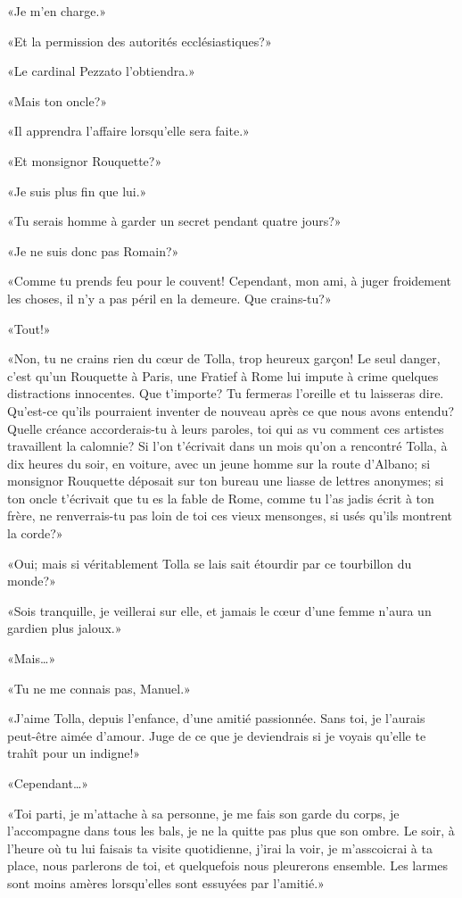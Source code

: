 «Je m'en charge.»

«Et la permission des autorités ecclésiastiques?»

«Le cardinal Pezzato l'obtiendra.»

«Mais ton oncle?»

«Il apprendra l'affaire lorsqu'elle sera faite.»

«Et monsignor Rouquette?»

«Je suis plus fin que lui.»

«Tu serais homme à garder un secret pendant quatre jours?»

«Je ne suis donc pas Romain?»

«Comme tu prends feu pour le couvent! Cependant, mon ami, à juger froidement les choses, il n'y a pas péril en la demeure. Que crains-tu?»

«Tout!»

«Non, tu ne crains rien du c\oe{}ur de Tolla, trop heureux garçon! Le seul danger, c'est qu'un Rouquette à Paris, une Fratief à Rome lui impute à crime quelques distractions innocentes. Que t'importe? Tu fermeras l'oreille et tu laisseras dire. Qu'est-ce qu'ils pourraient inventer de nouveau après ce que nous avons entendu? Quelle créance accorderais-tu à leurs paroles, toi qui as vu comment ces artistes travaillent la calomnie? Si l'on t'écrivait dans un mois qu'on a rencontré Tolla, à dix heures du soir, en voiture, avec un jeune homme sur la route d'Albano; si monsignor Rouquette déposait sur ton bureau une liasse de lettres anonymes; si ton oncle t'écrivait que tu es la fable de Rome, comme tu l'as jadis écrit à ton frère, ne renverrais-tu pas loin de toi ces vieux mensonges, si usés qu'ils montrent la corde?»

«Oui; mais si véritablement Tolla se lais sait étourdir par ce tourbillon du monde?»

«Sois tranquille, je veillerai sur elle, et jamais le c\oe{}ur d'une femme n'aura un gardien plus jaloux.»

«Mais\ldots{}»

«Tu ne me connais pas, Manuel.»

«J'aime Tolla, depuis l'enfance, d'une amitié passionnée. Sans toi, je l'aurais peut-être aimée d'amour. Juge de ce que je deviendrais si je voyais qu'elle te trahît pour un indigne!»

«Cependant\ldots{}»

«Toi parti, je m'attache à sa personne, je me fais son garde du corps, je l'accompagne dans tous les bals, je ne la quitte pas plus que son ombre. Le soir, à l'heure où tu lui faisais ta visite quotidienne, j'irai la voir, je m'asscoicrai à ta place, nous parlerons de toi, et quelquefois nous pleurerons ensemble. Les larmes sont moins amères lorsqu'elles sont essuyées par l'amitié.»

